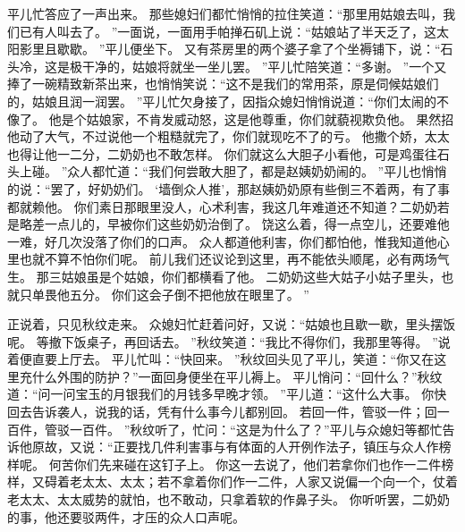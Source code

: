 平儿忙答应了一声出来。
那些媳妇们都忙悄悄的拉住笑道：“那里用姑娘去叫，我们已有人叫去了。
”一面说，一面用手帕掸石矶上说：“姑娘站了半天乏了，这太阳影里且歇歇。
”平儿便坐下。
又有茶房里的两个婆子拿了个坐褥铺下，说：“石头冷，这是极干净的，姑娘将就坐一坐儿罢。
”平儿忙陪笑道：“多谢。
”一个又捧了一碗精致新茶出来，也悄悄笑说：“这不是我们的常用茶，原是伺候姑娘们的，姑娘且润一润罢。
”平儿忙欠身接了，因指众媳妇悄悄说道：“你们太闹的不像了。
他是个姑娘家，不肯发威动怒，这是他尊重，你们就藐视欺负他。
果然招他动了大气，不过说他一个粗糙就完了，你们就现吃不了的亏。
他撒个娇，太太也得让他一二分，二奶奶也不敢怎样。
你们就这么大胆子小看他，可是鸡蛋往石头上碰。
”众人都忙道：“我们何尝敢大胆了，都是赵姨奶奶闹的。
”平儿也悄悄的说：“罢了，好奶奶们。
‘墙倒众人推’，那赵姨奶奶原有些倒三不着两，有了事都就赖他。
你们素日那眼里没人，心术利害，我这几年难道还不知道？二奶奶若是略差一点儿的，早被你们这些奶奶治倒了。
饶这么着，得一点空儿，还要难他一难，好几次没落了你们的口声。
众人都道他利害，你们都怕他，惟我知道他心里也就不算不怕你们呢。
前儿我们还议论到这里，再不能依头顺尾，必有两场气生。
那三姑娘虽是个姑娘，你们都横看了他。
二奶奶这些大姑子小姑子里头，也就只单畏他五分。
你们这会子倒不把他放在眼里了。
”\par
正说着，只见秋纹走来。
众媳妇忙赶着问好，又说：“姑娘也且歇一歇，里头摆饭呢。
等撤下饭桌子，再回话去。
”秋纹笑道：“我比不得你们，我那里等得。
”说着便直要上厅去。
平儿忙叫：“快回来。
”秋纹回头见了平儿，笑道：“你又在这里充什么外围的防护？”一面回身便坐在平儿褥上。
平儿悄问：“回什么？”秋纹道：“问一问宝玉的月银我们的月钱多早晚才领。
”平儿道：“这什么大事。
你快回去告诉袭人，说我的话，凭有什么事今儿都别回。
若回一件，管驳一件；回一百件，管驳一百件。
”秋纹听了，忙问：“这是为什么了？”平儿与众媳妇等都忙告诉他原故，又说：“正要找几件利害事与有体面的人开例作法子，镇压与众人作榜样呢。
何苦你们先来碰在这钉子上。
你这一去说了，他们若拿你们也作一二件榜样，又碍着老太太、太太；若不拿着你们作一二件，人家又说偏一个向一个，仗着老太太、太太威势的就怕，也不敢动，只拿着软的作鼻子头。
你听听罢，二奶奶的事，他还要驳两件，才压的众人口声呢。

